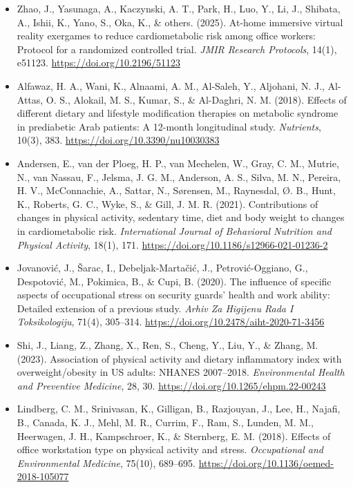 \begin{itemize}
    \item Zhao, J., Yasunaga, A., Kaczynski, A. T., Park, H., Luo, Y., Li, J., Shibata, A., Ishii, K., Yano, S., Oka, K., \& others. (2025). At-home immersive virtual reality exergames to reduce cardiometabolic risk among office workers: Protocol for a randomized controlled trial. \textit{JMIR Research Protocols}, 14(1), e51123. \url{https://doi.org/10.2196/51123}

    \item Alfawaz, H. A., Wani, K., Alnaami, A. M., Al-Saleh, Y., Aljohani, N. J., Al-Attas, O. S., Alokail, M. S., Kumar, S., \& Al-Daghri, N. M. (2018). Effects of different dietary and lifestyle modification therapies on metabolic syndrome in prediabetic Arab patients: A 12-month longitudinal study. \textit{Nutrients}, 10(3), 383. \url{https://doi.org/10.3390/nu10030383}

    \item Andersen, E., van der Ploeg, H. P., van Mechelen, W., Gray, C. M., Mutrie, N., van Nassau, F., Jelsma, J. G. M., Anderson, A. S., Silva, M. N., Pereira, H. V., McConnachie, A., Sattar, N., Sørensen, M., Raynesdal, Ø. B., Hunt, K., Roberts, G. C., Wyke, S., \& Gill, J. M. R. (2021). Contributions of changes in physical activity, sedentary time, diet and body weight to changes in cardiometabolic risk. \textit{International Journal of Behavioral Nutrition and Physical Activity}, 18(1), 171. \url{https://doi.org/10.1186/s12966-021-01236-2}

    \item Jovanović, J., Šarac, I., Debeljak-Martačić, J., Petrović-Oggiano, G., Despotović, M., Pokimica, B., \& Cupi, B. (2020). The influence of specific aspects of occupational stress on security guards’ health and work ability: Detailed extension of a previous study. \textit{Arhiv Za Higijenu Rada I Toksikologiju}, 71(4), 305–314. \url{https://doi.org/10.2478/aiht-2020-71-3456}

    \item Shi, J., Liang, Z., Zhang, X., Ren, S., Cheng, Y., Liu, Y., \& Zhang, M. (2023). Association of physical activity and dietary inflammatory index with overweight/obesity in US adults: NHANES 2007–2018. \textit{Environmental Health and Preventive Medicine}, 28, 30. \url{https://doi.org/10.1265/ehpm.22-00243}

    \item Lindberg, C. M., Srinivasan, K., Gilligan, B., Razjouyan, J., Lee, H., Najafi, B., Canada, K. J., Mehl, M. R., Currim, F., Ram, S., Lunden, M. M., Heerwagen, J. H., Kampschroer, K., \& Sternberg, E. M. (2018). Effects of office workstation type on physical activity and stress. \textit{Occupational and Environmental Medicine}, 75(10), 689–695. \url{https://doi.org/10.1136/oemed-2018-105077}


\end{itemize}
